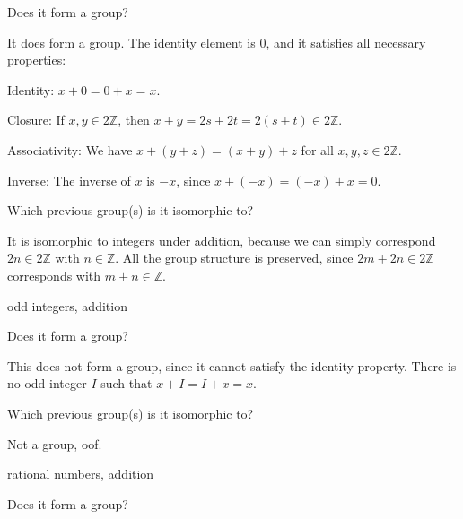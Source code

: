 \documentclass[../key.tex]{subfiles}
\begin{document}
\begin{iinner_problem}[start=1]
\item Does it form a group?
\end{iinner_problem}

\noindent It does form a group. The identity element is $0$, and it satisfies all necessary properties:

Identity: $x+0=0+x=x$.

Closure: If $x,y\in 2\mathbb{Z}$, then $x+y=2s+2t=2(s+t)\in 2\mathbb{Z}$.

Associativity: We have $x+(y+z)=(x+y)+z$ for all $x,y,z \in 2\mathbb{Z}$.

Inverse: The inverse of $x$ is $-x$, since $x+(-x)=(-x)+x=0$.

\begin{iinner_problem}
\item Which previous group(s) is it isomorphic to?
\end{iinner_problem}

\noindent It is isomorphic to integers under addition, because we can simply correspond $2n\in 2\mathbb{Z}$ with $n\in\mathbb{Z}$. All the group structure is preserved, since $2m+2n\in 2\mathbb{Z}$ corresponds with $m+n\in\mathbb{Z}$.

\begin{inner_problem}
\item odd integers, addition
\end{inner_problem}

\begin{iinner_problem}[start=1]
\item Does it form a group?
\end{iinner_problem}

\noindent This does not form a group, since it cannot satisfy the identity property. There is no odd integer $I$ such that $x+I=I+x=x$.

\begin{iinner_problem}
\item Which previous group(s) is it isomorphic to?
\end{iinner_problem}

\noindent Not a group, oof.

\begin{inner_problem}
\item rational numbers, addition
\end{inner_problem}

\begin{iinner_problem}[start=1]
\item Does it form a group?
\end{iinner_problem}
\end{document}
